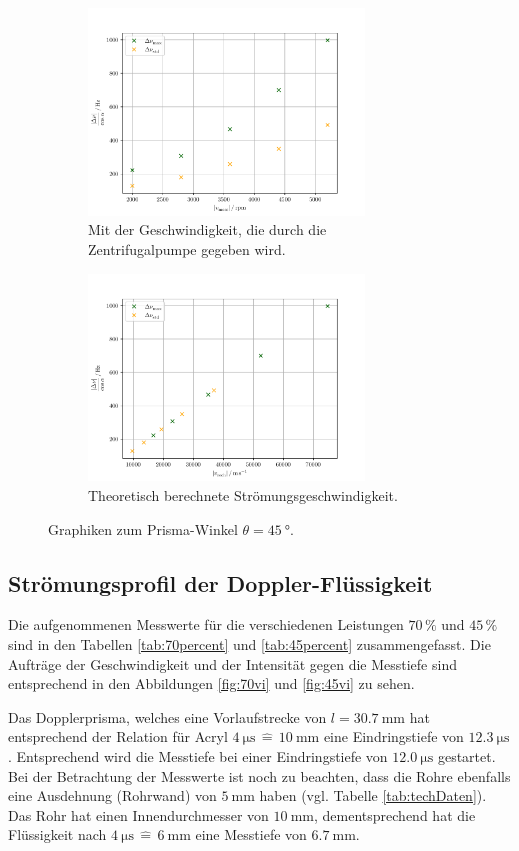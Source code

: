 \begin{figure}
    \centering
    \begin{subfigure}{0.48\textwidth}
        \centering
        \includegraphics[height=5.5cm]{plots/45_2.pdf}
        \caption{Mit der Geschwindigkeit, die durch die Zentrifugalpumpe gegeben wird.}
        \label{fig:exp45}
    \end{subfigure}
    \begin{subfigure}{0.48\textwidth}
        \centering
        \includegraphics[height=5.5cm]{plots/45_1.pdf}
        \caption{Theoretisch berechnete Strömungsgeschwindigkeit.}
        \label{fig:theo45}
    \end{subfigure}
    \caption{Graphiken zum Prisma-Winkel $\theta=\SI{45}{\degree}$.}
    \label{fig:45}
\end{figure}

\subsection{Strömungsprofil der Doppler-Flüssigkeit}

Die aufgenommenen Messwerte für die verschiedenen Leistungen $70\,\%$ und $45\,\%$ sind in den Tabellen \ref{tab:70percent}
und \ref{tab:45percent} zusammengefasst. 
Die Aufträge der Geschwindigkeit und der Intensität gegen die Messtiefe sind entsprechend in den Abbildungen \ref{fig:70vi} 
und \ref{fig:45vi} zu sehen. 

Das Dopplerprisma, welches eine Vorlaufstrecke von $l=\SI{30.7}{\milli\meter}$ hat entsprechend der Relation für 
Acryl $\SI{4}{\micro\second}\,\widehat{=}\,\SI{10}{\milli\meter}$ eine Eindringstiefe von $\SI{12.3}{\micro\second}$. 
Entsprechend wird die Messtiefe bei einer Eindringstiefe von $\SI{12.0}{\micro\second}$ gestartet. 
Bei der Betrachtung der Messwerte ist noch zu beachten, dass die Rohre ebenfalls eine Ausdehnung (Rohrwand)
von $\SI{5}{\milli\meter}$ haben (vgl. Tabelle \ref{tab:techDaten}). 
Das Rohr hat einen Innendurchmesser von $\SI{10}{\milli\meter}$, dementsprechend hat die Flüssigkeit nach $\SI{4}{\micro\second}\,\widehat{=}\,\SI{6}{\milli\meter}$
eine Messtiefe von $\SI{6.7}{\milli\meter}$. 

